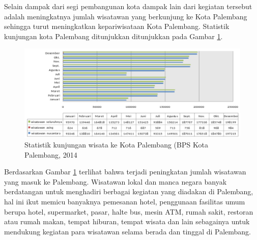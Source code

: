 Selain dampak dari segi pembangunan kota dampak lain dari kegiatan tersebut adalah meningkatnya jumlah wisatawan yang berkunjung ke Kota Palembang sehingga turut meningkatkan kepariwisataan Kota Palembang. Statistik kunjungan kota Palembang ditunjukkan ditunjukkan pada Gambar \ref{fig:bps}.\\

\begin{figure}[H]
  \centering
    \includegraphics[scale=0.41]{gambar/bps}
    \caption{Statistik kunjungan wisata ke Kota Palembang (BPS Kota Palembang, 2014}
    \label{fig:bps}
\end{figure}

Berdasarkan Gambar \ref{fig:bps} terlihat bahwa terjadi peningkatan jumlah wisatawan yang masuk ke Palembang. Wisatawan lokal dan manca negara banyak berdatangan untuk menghadiri berbagai kegiatan yang diadakan di Palembang, hal ini ikut memicu banyaknya pemesanan hotel, penggunaan fasilitas umum berupa hotel, supermarket, pasar, halte bus, mesin ATM, rumah sakit, restoran atau rumah makan, tempat hiburan, tempat wisata dan lain sebagainya untuk mendukung kegiatan para wisatawan selama berada dan tinggal di Palembang.\

